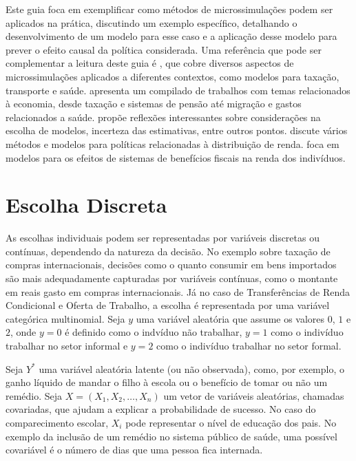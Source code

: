 \documentclass[12pt, a4paper, openany]{book}
\numberwithin{equation}{chapter}
\numberwithin{table}{chapter}
\numberwithin{figure}{chapter}
\theoremstyle{break}
\begin{document}
Este guia foca em exemplificar como métodos de microssimulações podem ser aplicados na prática, discutindo um exemplo específico, detalhando o desenvolvimento de um modelo para esse caso e a aplicação desse modelo para prever o efeito causal da política considerada. Uma referência que pode ser complementar a leitura deste guia é \textcite{o2014handbook}, que cobre diversos aspectos de microssimulações aplicados a diferentes contextos, como modelos para taxação, transporte e saúde. \textcite{mitton2000microsimulation} apresenta um compilado de trabalhos com temas relacionados à economia, desde taxação e sistemas de pensão até migração e gastos relacionados a saúde. \textcite[capítulo~1]{mitton2000microsimulation} propõe reflexões interessantes sobre considerações na escolha de modelos, incerteza das estimativas, entre outros pontos. \textcite{odonoghue2021} discute vários métodos e modelos para políticas relacionadas à distribuição de renda. \textcite{figari2015} foca em modelos para os efeitos de sistemas de benefícios fiscais na renda dos indivíduos. 







\chapter{Escolha Discreta}
\label{sec:discrete_choice}
As escolhas individuais podem ser representadas por variáveis discretas ou contínuas, dependendo da natureza da decisão. No exemplo sobre taxação de compras internacionais, decisões como o quanto consumir em bens importados são mais adequadamente capturadas por variáveis contínuas, como o montante em reais gasto em compras internacionais. Já no caso de Transferências de Renda Condicional e Oferta de Trabalho, a escolha é representada por uma variável categórica multinomial. Seja \( y \) uma variável aleatória que assume os valores \( 0 \), \( 1 \) e \( 2 \), onde \( y = 0 \) é definido como o indvíduo não trabalhar, \( y = 1 \) como o indivíduo trabalhar no setor informal e \( y = 2 \) como o indivíduo trabalhar no setor formal.

Seja \( Y^* \) uma variável aleatória latente (ou não observada), como, por exemplo, o ganho líquido de mandar o filho à escola ou o benefício de tomar ou não um remédio. Seja \( X = (X_1, X_2, \ldots, X_n) \) um vetor de variáveis aleatórias, chamadas covariadas, que ajudam a explicar a probabilidade de sucesso. No caso do comparecimento escolar, \( X_i \) pode representar o nível de educação dos pais. No exemplo da inclusão de um remédio no sistema público de saúde, uma possível covariável é o número de dias que uma pessoa fica internada.
\end{document}
